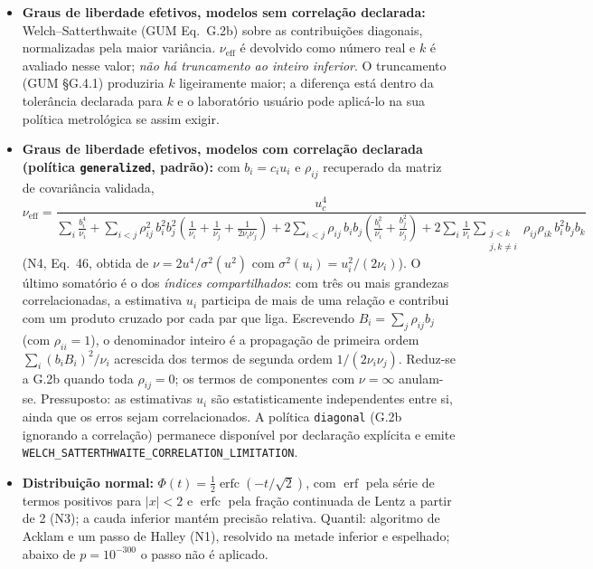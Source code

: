 \documentclass[11pt,a4paper]{article}
\begin{document}
\begin{itemize}
  \item \textbf{Graus de liberdade efetivos, modelos sem correlação declarada:} Welch--Satterthwaite (GUM Eq.~G.2b) sobre as contribuições diagonais, normalizadas pela maior variância. \(\nu_{\text{eff}}\) é devolvido como número real e \(k\) é avaliado nesse valor; \emph{não há truncamento ao inteiro inferior}. O truncamento (GUM §G.4.1) produziria \(k\) ligeiramente maior; a diferença está dentro da tolerância declarada para \(k\) e o laboratório usuário pode aplicá-lo na sua política metrológica se assim exigir.
  \item \textbf{Graus de liberdade efetivos, modelos com correlação declarada (política \texttt{generalized}, padrão):} com \(b_i = c_i u_i\) e \(\rho_{ij}\) recuperado da matriz de covariância validada,
  \begin{equation*}
    \nu_{\text{eff}} = \frac{u_c^4}{\displaystyle \sum_i \frac{b_i^4}{\nu_i}
      + \sum_{i<j} \rho_{ij}^2\, b_i^2 b_j^2 \left(\frac{1}{\nu_i} + \frac{1}{\nu_j} + \frac{1}{2\nu_i\nu_j}\right)
      + 2 \sum_{i<j} \rho_{ij}\, b_i b_j \left(\frac{b_i^2}{\nu_i} + \frac{b_j^2}{\nu_j}\right)
      + 2 \sum_i \frac{1}{\nu_i} \sum_{\substack{j<k \\ j,k \neq i}} \rho_{ij}\rho_{ik}\, b_i^2 b_j b_k}
  \end{equation*}
  (N4, Eq.~46, obtida de \(\nu = 2u^4/\sigma^2(u^2)\) com \(\sigma^2(u_i) = u_i^2/(2\nu_i)\)). O último somatório é o dos \emph{índices compartilhados}: com três ou mais grandezas correlacionadas, a estimativa \(u_i\) participa de mais de uma relação e contribui com um produto cruzado por cada par que liga. Escrevendo \(B_i = \sum_j \rho_{ij} b_j\) (com \(\rho_{ii} = 1\)), o denominador inteiro é a propagação de primeira ordem \(\sum_i (b_i B_i)^2/\nu_i\) acrescida dos termos de segunda ordem \(1/(2\nu_i\nu_j)\). Reduz-se a G.2b quando toda \(\rho_{ij} = 0\); os termos de componentes com \(\nu = \infty\) anulam-se. Pressuposto: as estimativas \(u_i\) são estatisticamente independentes entre si, ainda que os erros sejam correlacionados. A política \texttt{diagonal} (G.2b ignorando a correlação) permanece disponível por declaração explícita e emite \texttt{WELCH\_SATTERTHWAITE\_CORRELATION\_LIMITATION}.
  \item \textbf{Distribuição normal:} \(\Phi(t) = \tfrac{1}{2}\operatorname{erfc}(-t/\sqrt{2})\), com \(\operatorname{erf}\) pela série de termos positivos para \(|x| < 2\) e \(\operatorname{erfc}\) pela fração continuada de Lentz a partir de 2 (N3); a cauda inferior mantém precisão relativa. Quantil: algoritmo de Acklam e um passo de Halley (N1), resolvido na metade inferior e espelhado; abaixo de \(p = 10^{-300}\) o passo não é aplicado.

\end{itemize}
\end{document}
